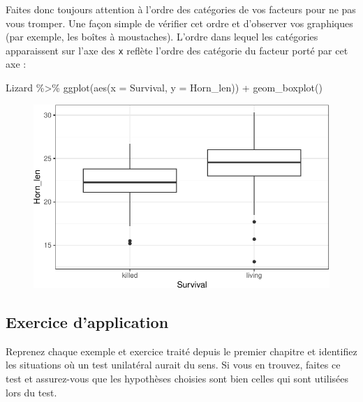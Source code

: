 \documentclass[
  a4paper,
  DIV=11,
  numbers=noendperiod,
  oneside]{scrreprt}
\newenvironment{Shaded}{}{}
\newcommand{\AttributeTok}[1]{\textcolor[rgb]{0.84,0.23,0.29}{#1}}
\newcommand{\FunctionTok}[1]{\textcolor[rgb]{0.44,0.26,0.76}{#1}}
\newcommand{\NormalTok}[1]{\textcolor[rgb]{0.14,0.16,0.18}{#1}}
\newcommand{\SpecialCharTok}[1]{\textcolor[rgb]{0.00,0.36,0.77}{#1}}
\begin{document}
Faites donc toujours attention à l'ordre des catégories de vos facteurs
pour ne pas vous tromper. Une façon simple de vérifier cet ordre et
d'observer vos graphiques (par exemple, les boîtes à moustaches).
L'ordre dans lequel les catégories apparaissent sur l'axe des \texttt{x}
reflète l'ordre des catégorie du facteur porté par cet axe :

\begin{Shaded}
\begin{Highlighting}[]
\NormalTok{Lizard }\SpecialCharTok{\%\textgreater{}\%} 
  \FunctionTok{ggplot}\NormalTok{(}\FunctionTok{aes}\NormalTok{(}\AttributeTok{x =}\NormalTok{ Survival, }\AttributeTok{y =}\NormalTok{ Horn\_len)) }\SpecialCharTok{+}
  \FunctionTok{geom\_boxplot}\NormalTok{()}
\end{Highlighting}
\end{Shaded}

\begin{figure}[H]

{\centering \includegraphics{03-TwoSampleTests_files/figure-pdf/unnamed-chunk-32-1.pdf}

}

\end{figure}

\hypertarget{exercice-dapplication-2}{%
\subsection{Exercice d'application}\label{exercice-dapplication-2}}

Reprenez chaque exemple et exercice traité depuis le premier chapitre et
identifiez les situations où un test unilatéral aurait du sens. Si vous
en trouvez, faites ce test et assurez-vous que les hypothèses choisies
sont bien celles qui sont utilisées lors du test.
\end{document}
